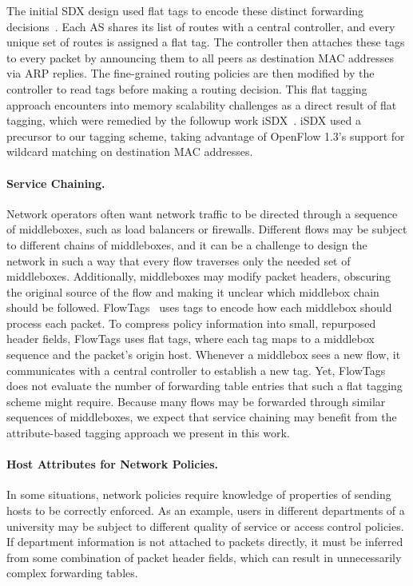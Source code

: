 The initial SDX design used flat tags to encode these distinct
forwarding decisions~\cite{sdx}. Each AS shares its list of routes with
a central controller, and every unique set of routes is assigned a flat
tag. The controller then attaches these tags to every packet by
announcing them to all peers as destination MAC addresses via ARP
replies. The fine-grained routing policies are then modified by the
controller to read tags before making a routing decision.  This flat
tagging approach encounters into memory scalability challenges as a
direct result of flat tagging, which were remedied by the followup work
iSDX~\cite{isdx}. iSDX used a precursor to our tagging scheme, taking
advantage of OpenFlow 1.3's support for wildcard matching on destination
MAC addresses.

\paragraph{Service Chaining.}
Network operators often want network traffic to be directed through a
sequence of middleboxes, such as load balancers or firewalls.  Different
flows may be subject to different chains of middleboxes, and it can be a
challenge to design the network in such a way that every flow traverses
only the needed set of middleboxes. Additionally, middleboxes may modify
packet headers, obscuring the original source of the flow and making it
unclear which middlebox chain should be followed.
FlowTags~\cite{flowtags} uses tags to encode how each middlebox should
process each packet. To compress policy information into small,
repurposed header fields, FlowTags uses flat tags, where each tag maps
to a middlebox sequence and the packet's origin host. Whenever a
middlebox sees a new flow, it communicates with a central controller to
establish a new tag.  Yet, FlowTags does not evaluate the number of
forwarding table entries that such a flat tagging scheme might
require. Because many flows may be forwarded through similar sequences
of middleboxes, we expect that service chaining may benefit from the
attribute-based tagging approach we present in this work.
 

\paragraph{Host Attributes for Network Policies.}
In some situations, network policies require knowledge of properties of sending hosts to be correctly enforced. As an example, users in different departments of a university may be subject to different quality of service or access control policies. If department information is not attached to packets directly, it must be inferred from some combination of packet header fields, which can result in unnecessarily complex forwarding tables. 

